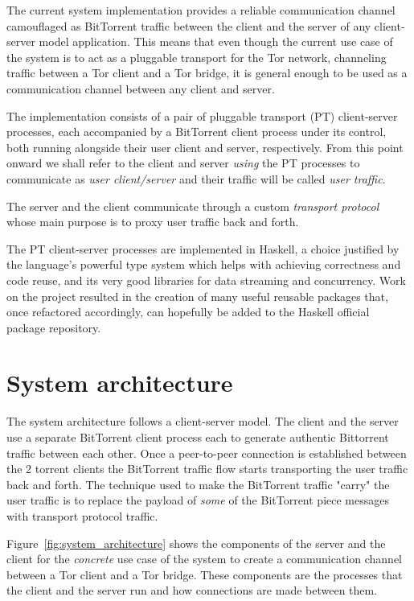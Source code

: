\documentclass[11pt]{book} %
\begin{document}
The current system implementation provides a reliable communication channel camouflaged as BitTorrent traffic between the client and the server of any client-server model application. This means that even though the current use case of the system is to act as a pluggable transport for the Tor network, channeling traffic between a Tor client and a Tor bridge, it is general enough to be used as a communication channel between any client and server.

The implementation consists of a pair of pluggable transport (PT) client-server processes, each accompanied by a BitTorrent client process under its control, both running alongside their user client and server, respectively. From this point onward we shall refer to the client and server \textit{using} the PT processes to communicate as \textit{user client/server} and their traffic will be called \textit{user traffic}. 

The server and the client communicate through a custom \textit{transport protocol} whose main purpose is to proxy user traffic back and forth. 

The PT client-server processes are implemented in Haskell, a choice justified by the language's powerful type system which helps with achieving correctness and code reuse, and its very good libraries for data streaming and concurrency. Work on the project resulted in the creation of many useful reusable packages that, once refactored accordingly, can hopefully be added to the Haskell official package repository.

\section{System architecture}

The system architecture follows a client-server model. The client and the server use a separate BitTorrent client process each to generate authentic Bittorrent traffic between each other. Once a peer-to-peer connection is established between the 2 torrent clients the BitTorrent traffic flow starts transporting the user traffic back and forth. The technique used to make the BitTorrent traffic "carry" the user traffic is to replace the payload of \textit{some} of the BitTorrent piece messages with transport protocol traffic. 


Figure~\ref{fig:system_architecture} shows the components of the server and the client for the \textit{concrete} use case of the system to create a communication channel between a Tor client and a Tor bridge. These components are the processes that the client and the server run and how connections are made between them.
\end{document}
